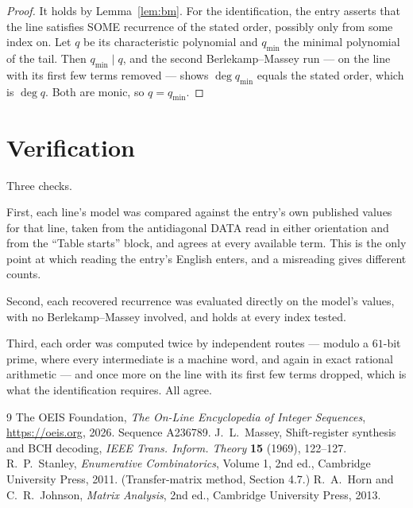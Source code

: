\documentclass[11pt,a4paper]{article}
\theoremstyle{plain}
\theoremstyle{definition}
\begin{document}
\begin{proof}
It holds by Lemma~\ref{lem:bm}. For the identification, the entry asserts that the line
satisfies SOME recurrence of the stated order, possibly only from some index on. Let $q$ be its
characteristic polynomial and $q_{\min}$ the minimal polynomial of the tail. Then
$q_{\min}\mid q$, and the second Berlekamp--Massey run --- on the line with its first few
terms removed --- shows $\deg q_{\min}$ equals the stated order, which is $\deg q$. Both are
monic, so $q=q_{\min}$.
\end{proof}

\section{Verification}

Three checks.

First, each line's model was compared against the entry's own published values for that line,
taken from the antidiagonal DATA read in either orientation and from the ``Table starts''
block, and agrees at every available term. This is the only point at which reading the entry's
English enters, and a misreading gives different counts.

Second, each recovered recurrence was evaluated directly on the model's values, with no
Berlekamp--Massey involved, and holds at every index tested.

Third, each order was computed twice by independent routes --- modulo a $61$-bit prime, where
every intermediate is a machine word, and again in exact rational arithmetic --- and once more
on the line with its first few terms dropped, which is what the identification requires. All
agree.

\begin{thebibliography}{9}
 The OEIS Foundation, \emph{The On-Line Encyclopedia of Integer
Sequences}, \url{https://oeis.org}, 2026. Sequence A236789.
 J.~L.~Massey, Shift-register synthesis and BCH decoding, \emph{IEEE
Trans. Inform. Theory} \textbf{15} (1969), 122--127.
 R.~P.~Stanley, \emph{Enumerative Combinatorics}, Volume 1, 2nd ed.,
Cambridge University Press, 2011. (Transfer-matrix method, Section 4.7.)
 R.~A.~Horn and C.~R.~Johnson, \emph{Matrix Analysis}, 2nd ed., Cambridge
University Press, 2013.
\end{thebibliography}
\end{document}
